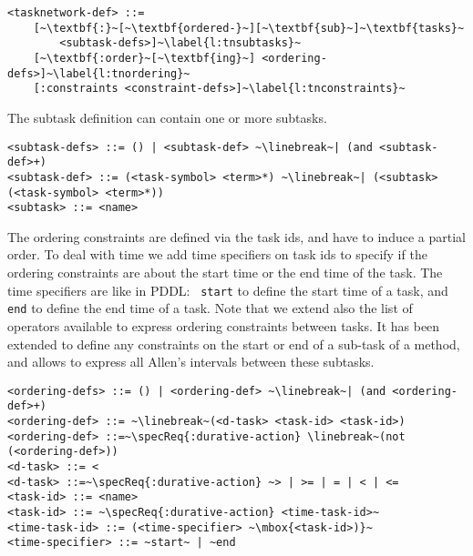 \documentclass[letterpaper]{article} %
\begin{document}
\begin{lstlisting}[firstnumber=last, escapechar=~]
<tasknetwork-def> ::=
    [~\textbf{:}~[~\textbf{ordered-}~][~\textbf{sub}~]~\textbf{tasks}~
        <subtask-defs>]~\label{l:tnsubtasks}~
    [~\textbf{:order}~[~\textbf{ing}~] <ordering-defs>]~\label{l:tnordering}~
    [:constraints <constraint-defs>]~\label{l:tnconstraints}~
\end{lstlisting}

%
%
\noindent The subtask definition can contain one or more subtasks.

\begin{lstlisting}[firstnumber=last, escapechar=~]
<subtask-defs> ::= () | <subtask-def> ~\linebreak~| (and <subtask-def>+)
<subtask-def> ::= (<task-symbol> <term>*) ~\linebreak~| (<subtask> (<task-symbol> <term>*))
<subtask> ::= <name>
\end{lstlisting}

%
%
The ordering constraints are defined via the task ids, and have to induce a partial order. To deal with time we add time specifiers on task ids to specify if the ordering constraints are about the start time or the end time of the task. The time specifiers are like in PDDL: ~{\tt start} to define the start time of a task, and {\tt end}  to define the end time of a task. Note that we extend also the list of operators available to express ordering constraints between tasks. It has been extended to define any constraints on the start or end of a sub-task of a method, and allows to express all Allen's intervals \citep{allen81} between these subtasks.

\begin{lstlisting}[firstnumber=last, escapechar=~]
<ordering-defs> ::= () | <ordering-def> ~\linebreak~| (and <ordering-def>+)
<ordering-def> ::= ~\linebreak~(<d-task> <task-id> <task-id>)
<ordering-def> ::=~\specReq{:durative-action} \linebreak~(not (<ordering-def>))
<d-task> ::= <
<d-task> ::=~\specReq{:durative-action} ~> | >= | = | < | <=
<task-id> ::= <name>
<task-id> ::= ~\specReq{:durative-action} <time-task-id>~
<time-task-id> ::= (<time-specifier> ~\mbox{<task-id>)}~
<time-specifier> ::= ~start~ | ~end
\end{lstlisting}
\end{document}
